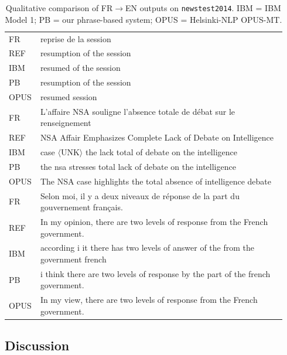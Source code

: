 \documentclass[11pt]{article}
\begin{document}
\begin{table}[t]
\centering
\small
\begin{tabular}{p{0.08\linewidth}p{0.86\linewidth}}
\toprule
FR  & reprise de la session \\
REF & resumption of the session \\
IBM & resumed of the session \\
PB  & resumption of the session \\
OPUS & resumed session \\
\midrule
FR  & L'affaire NSA souligne l'absence totale de débat sur le renseignement \\
REF & NSA Affair Emphasizes Complete Lack of Debate on Intelligence \\
IBM & case $\langle$UNK$\rangle$ the lack total of debate on the intelligence \\
PB  & the nsa stresses total lack of debate on the intelligence \\
OPUS & The NSA case highlights the total absence of intelligence debate \\
\midrule
FR  & Selon moi, il y a deux niveaux de réponse de la part du gouvernement français. \\
REF & In my opinion, there are two levels of response from the French government. \\
IBM & according i it there has two levels of answer of the from the government french \\
PB  & i think there are two levels of response by the part of the french government. \\
OPUS & In my view, there are two levels of response from the French government. \\
\bottomrule
\end{tabular}
\caption{Qualitative comparison of FR$\rightarrow$EN outputs on \texttt{newstest2014}. IBM = IBM Model 1; PB = our phrase-based system; OPUS = Helsinki-NLP OPUS-MT.}
\label{tab:examples}
\end{table}
 
\subsection{Discussion}
\end{document}

